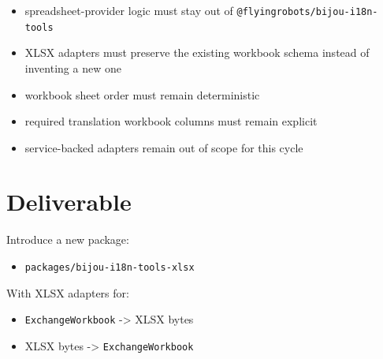 \begin{itemize}
\tightlist
\item
  spreadsheet-provider logic must stay out of \texttt{@\allowbreak{}f\allowbreak{}l\allowbreak{}y\allowbreak{}i\allowbreak{}n\allowbreak{}g\allowbreak{}r\allowbreak{}o\allowbreak{}b\allowbreak{}o\allowbreak{}t\allowbreak{}s\allowbreak{}/\allowbreak{}b\allowbreak{}i\allowbreak{}j\allowbreak{}o\allowbreak{}u\allowbreak{}-\allowbreak{}i\allowbreak{}1\allowbreak{}8\allowbreak{}n\allowbreak{}-\allowbreak{}t\allowbreak{}o\allowbreak{}o\allowbreak{}l\allowbreak{}s}
\item
  XLSX adapters must preserve the existing workbook schema instead of inventing a new one
\item
  workbook sheet order must remain deterministic
\item
  required translation workbook columns must remain explicit
\item
  service-backed adapters remain out of scope for this cycle
\end{itemize}

\section{Deliverable}\label{record-193-deliverable}

Introduce a new package:

\begin{itemize}
\tightlist
\item
  \texttt{p\allowbreak{}a\allowbreak{}c\allowbreak{}k\allowbreak{}a\allowbreak{}g\allowbreak{}e\allowbreak{}s\allowbreak{}/\allowbreak{}b\allowbreak{}i\allowbreak{}j\allowbreak{}o\allowbreak{}u\allowbreak{}-\allowbreak{}i\allowbreak{}1\allowbreak{}8\allowbreak{}n\allowbreak{}-\allowbreak{}t\allowbreak{}o\allowbreak{}o\allowbreak{}l\allowbreak{}s\allowbreak{}-\allowbreak{}x\allowbreak{}l\allowbreak{}s\allowbreak{}x}
\end{itemize}

With XLSX adapters for:

\begin{itemize}
\tightlist
\item
  \texttt{E\allowbreak{}x\allowbreak{}c\allowbreak{}h\allowbreak{}a\allowbreak{}n\allowbreak{}g\allowbreak{}e\allowbreak{}W\allowbreak{}o\allowbreak{}r\allowbreak{}k\allowbreak{}b\allowbreak{}o\allowbreak{}o\allowbreak{}k} -\textgreater{} XLSX bytes
\item
  XLSX bytes -\textgreater{} \texttt{E\allowbreak{}x\allowbreak{}c\allowbreak{}h\allowbreak{}a\allowbreak{}n\allowbreak{}g\allowbreak{}e\allowbreak{}W\allowbreak{}o\allowbreak{}r\allowbreak{}k\allowbreak{}b\allowbreak{}o\allowbreak{}o\allowbreak{}k}
\end{itemize}

